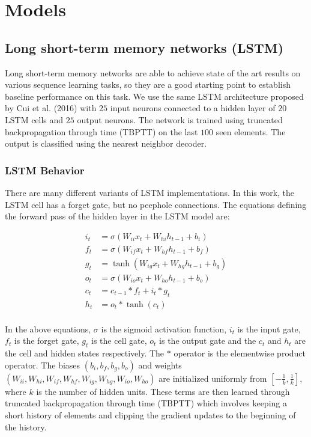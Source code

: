 \documentclass{article}
\begin{document}
\section*{Models}

\subsection*{Long short-term memory networks (LSTM)}

Long short-term memory \cite{hochreiter1997long} networks are able to achieve state of the art results on various sequence learning tasks, so they are a good starting point to establish baseline performance on this task. We use the same LSTM architecture proposed by Cui et al. (2016) with $25$ input neurons connected to a hidden layer of $20$ LSTM cells and $25$ output neurons. The network is trained using truncated backpropagation through time (TBPTT) \cite{mozer1995focused} on the last $100$ seen elements. The output is classified using the nearest neighbor decoder.

\subsubsection*{LSTM Behavior}
There are many different variants of LSTM implementations. In this work, the LSTM cell has a forget gate, but no peephole connections. The equations defining the forward pass of the hidden layer in the LSTM model are:

\begin{align*}
    i_t &= \sigma\left(W_{ii}x_t + W_{hi}h_{t-1} + b_i\right)\\
    f_t &= \sigma\left(W_{if}x_t + W_{hf}h_{t-1} + b_f\right)\\
    g_t &= \tanh\left(W_{ig}x_t + W_{hg}h_{t-1} + b_g\right)\\
    o_t &= \sigma\left(W_{io}x_t + W_{ho}h_{t-1} + b_o\right)\\
    c_t &= c_{t-1}\ast f_t + i_t \ast g_t\\
    h_t &= o_t \ast \tanh\left(c_t\right)\\
\end{align*}

In the above equations, $\sigma$ is the sigmoid activation function, $i_t$ is the input gate, $f_t$ is the forget gate, $g_t$ is the cell gate, $o_t$ is the output gate and the $c_t$ and $h_t$ are the cell and hidden states respectively. The $\ast$ operator is the elementwise product operator. The biases $\left(b_i, b_f, b_g, b_o\right)$ and weights $\left(W_{ii}, W_{hi}, W_{if}, W_{hf}, W_{ig}, W_{hg},W_{io}, W_{ho}\right)$ are initialized uniformly from $\left[-\frac{1}{k}, \frac{1}{k}\right]$, where $k$ is the number of hidden units. These terms are then learned through truncated backpropagation through time (TBPTT) which involves keeping a short history of elements and clipping the gradient updates to the beginning of the history. \cite{sutskever2013training}
\end{document}
